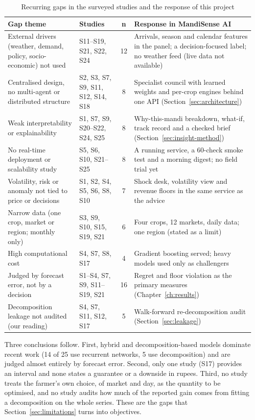 \begin{table}[!t]
\centering
\caption{Recurring gaps in the surveyed studies and the response of this project}
\label{tab:survey-gaps}
\small
\renewcommand{\arraystretch}{1.15}
\begin{tabular}{|p{4.0cm}|p{3.4cm}|c|p{6.4cm}|}
\hline
\textbf{Gap theme} & \textbf{Studies} & \textbf{n} & \textbf{Response in MandiSense AI} \\ \hline
External drivers (weather, demand, policy, socio-economic) not used & S11--S19, S21, S22, S24 & 12 & Arrivals, season and calendar features in the panel; a decision-focused label; no weather feed (live data not available) \\ \hline
Centralised design, no multi-agent or distributed structure & S2, S3, S7, S9, S11, S12, S14, S18 & 8 & Specialist council with learned weights and per-crop engines behind one API (Section~\ref{sec:architecture}) \\ \hline
Weak interpretability or explainability & S1, S7, S9, S20--S22, S24, S25 & 8 & Why-this-mandi breakdown, what-if, track record and a checked brief (Section~\ref{sec:insight-method}) \\ \hline
No real-time deployment or scalability study & S5, S6, S10, S21--S25 & 8 & A running service, a 60-check smoke test and a morning digest; no field trial yet \\ \hline
Volatility, risk or anomaly not tied to price or decisions & S1, S2, S4, S5, S6, S8, S10 & 7 & Shock desk, volatility view and revenue floors in the same service as the advice \\ \hline
Narrow data (one crop, market or region; monthly only) & S3, S9, S10, S15, S19, S21 & 6 & Four crops, 12 markets, daily data; one region (stated as a limit) \\ \hline
High computational cost & S4, S7, S8, S17 & 4 & Gradient boosting served; heavy models used only as challengers \\ \hline
Judged by forecast error, not by a decision & S1--S4, S7, S9, S11--S19, S21 & 16 & Regret and floor violation as the primary measures (Chapter~\ref{ch:results}) \\ \hline
Decomposition leakage not audited (our reading) & S4, S7, S11, S12, S17 & 5 & Walk-forward re-decomposition audit (Section~\ref{sec:leakage}) \\ \hline
\end{tabular}
\end{table}

Three conclusions follow. First, hybrid and decomposition-based models dominate recent work (14 of 25 use recurrent networks, 5 use decomposition) and are judged almost entirely by forecast error. Second, only one study (S17) provides an interval and none states a guarantee or a downside in rupees. Third, no study treats the farmer's own choice, of market and day, as the quantity to be optimised, and no study audits how much of the reported gain comes from fitting a decomposition on the whole series. These are the gaps that Section~\ref{sec:limitations} turns into objectives.
